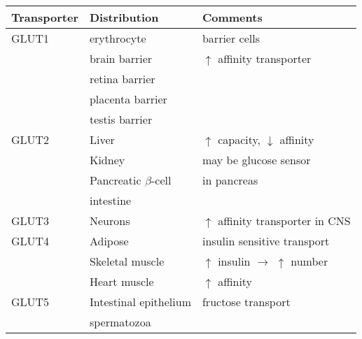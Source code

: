 \documentclass{scrartcl}
\begin{document}
\begin{enumerate}
\begin{center}
\begin{tabular}{lll}
Transporter & Distribution & Comments\\
\hline
GLUT1 & erythrocyte & barrier cells\\
 & brain barrier & \(\uparrow\) affinity transporter\\
 & retina barrier & \\
 & placenta barrier & \\
 & testis barrier & \\
\hline
GLUT2 & Liver & \(\uparrow\) capacity, \(\downarrow\) affinity\\
 & Kidney & may be glucose sensor\\
 & Pancreatic \(\beta\)-cell & in pancreas\\
 & intestine & \\
\hline
GLUT3 & Neurons & \(\uparrow\) affinity  transporter in CNS\\
\hline
GLUT4 & Adipose & insulin sensitive transport\\
 & Skeletal muscle & \(\uparrow\) insulin \(\to\) \(\uparrow\) number\\
 & Heart muscle & \(\uparrow\) affinity\\
\hline
GLUT5 & Intestinal epithelium & fructose transport\\
 & spermatozoa & \\
\end{tabular}
\end{center}
\end{enumerate}
\end{document}
